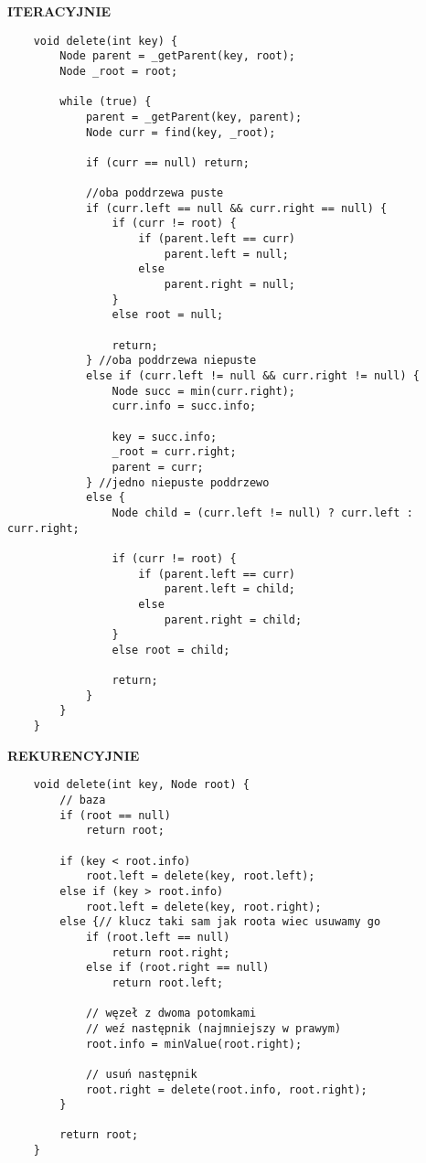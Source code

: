 \documentclass[algorytmy.tex]{subfiles}
\begin{document}
\textbf{ITERACYJNIE}
\begin{verbatim}
    void delete(int key) {
        Node parent = _getParent(key, root);
        Node _root = root;

        while (true) {
            parent = _getParent(key, parent);
            Node curr = find(key, _root);

            if (curr == null) return;

            //oba poddrzewa puste
            if (curr.left == null && curr.right == null) {
                if (curr != root) {
                    if (parent.left == curr)
                        parent.left = null;
                    else
                        parent.right = null;
                }
                else root = null;

                return;
            } //oba poddrzewa niepuste
            else if (curr.left != null && curr.right != null) {
                Node succ = min(curr.right);
                curr.info = succ.info;

                key = succ.info;
                _root = curr.right;
                parent = curr;
            } //jedno niepuste poddrzewo
            else {
                Node child = (curr.left != null) ? curr.left : curr.right;

                if (curr != root) {
                    if (parent.left == curr)
                        parent.left = child;
                    else
                        parent.right = child;
                }
                else root = child;

                return;
            }
        }
    }
\end{verbatim}

\textbf{REKURENCYJNIE}\\
\begin{verbatim}
    void delete(int key, Node root) {
        // baza
        if (root == null)
            return root;

        if (key < root.info)
            root.left = delete(key, root.left);
        else if (key > root.info)
            root.left = delete(key, root.right);
        else {// klucz taki sam jak roota wiec usuwamy go
            if (root.left == null)
                return root.right;
            else if (root.right == null)
                return root.left;

            // węzeł z dwoma potomkami
            // weź następnik (najmniejszy w prawym)
            root.info = minValue(root.right);

            // usuń następnik
            root.right = delete(root.info, root.right);
        }

        return root;
    }
\end{verbatim}
\end{document}
